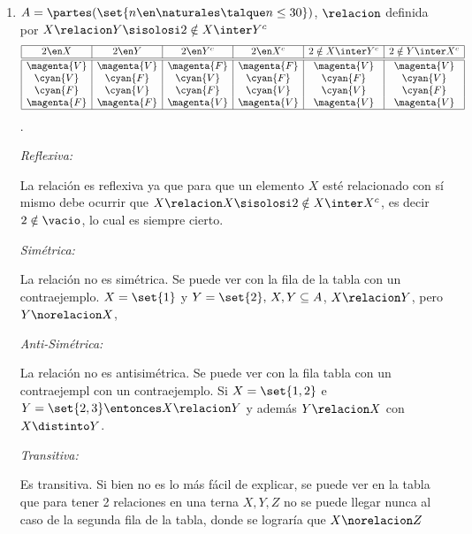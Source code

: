 \begin{enumerate}[label=\roman*)]
  \item $
          A =
          \partes(\set{n \en \naturales \talque n \leq 30})$, $\relacion$ definida por $X \relacion Y \sisolosi 2 \notin X \inter Y^c
        $
        $$
          \begin{array}{|c|c|c|c|c|c|}
            \hline
            2 \en X     & 2 \en Y     & 2 \en Y^c   & 2 \en X^c   & 2 \notin X \inter Y^c & 2 \notin Y \inter X^c \\ \hline  \hline
            \magenta{V} & \magenta{V} & \magenta{F} & \magenta{F} & \magenta{V}           & \magenta{V}           \\
            \cyan{V}    & \cyan{F}    & \cyan{V}    & \cyan{F}    & \cyan{F}              & \cyan{V}              \\
            \cyan{F}    & \cyan{V}    & \cyan{F}    & \cyan{V}    & \cyan{V}              & \cyan{F}              \\
            \magenta{F} & \magenta{F} & \magenta{V} & \magenta{V} & \magenta{V}           & \magenta{V}           \\ \hline
          \end{array}$$.

        \textit{Reflexiva:}

        La relación es reflexiva ya que para que un elemento $X$ esté relacionado con sí mismo debe ocurrir
        que $X \relacion X \sisolosi 2 \notin X \inter X^c$, es decir $2 \notin \vacio$, lo cual es siempre cierto.

        \textit{Simétrica:}

        La relación no es simétrica. Se puede ver con la  fila de la tabla con un contraejemplo.
        $X = \set{1}$ y $Y = \set{2},\, X,Y \subseteq A$, $X \relacion Y$, pero $Y \norelacion X$,

        \textit{Anti-Simétrica:}

        La relación no es antisimétrica. Se puede ver con la  fila tabla con un contraejempl
        con un contraejemplo. Si $X = \set{1,2}$ e $Y = \set{2,3} \entonces X \relacion Y$ y además $Y \relacion X$
        con  $X \distinto Y$.

        \textit{Transitiva:}

        Es transitiva. Si bien no es lo más fácil de explicar, se puede ver en la tabla que para tener 2 relaciones
        en una terna $X, Y, Z$ no se puede llegar nunca al caso de la segunda fila de la tabla, donde se lograría que
        $X \norelacion Z$


\end{enumerate}

